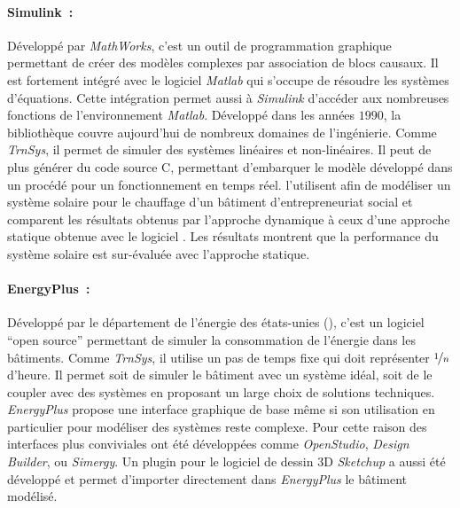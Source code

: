 \paragraph{Simulink~:} %
\label{par:simulink}
Développé par \textit{MathWorks}, c’est un outil de programmation graphique permettant de
créer des modèles complexes par association de blocs causaux. Il est fortement intégré
avec le logiciel \textit{Matlab} qui s’occupe de résoudre les systèmes d’équations. Cette
intégration permet aussi à  \textit{Simulink} d’accéder aux nombreuses fonctions de
l’environnement \textit{Matlab}.
Développé dans les années $1990$, la bibliothèque couvre
aujourd’hui de nombreux domaines de l’ingénierie. Comme \textit{TrnSys}, il permet de
simuler des systèmes linéaires et non-linéaires. Il peut de plus générer du code source C,
permettant d’embarquer le modèle développé dans un procédé pour un fonctionnement en temps
réel. \textcite{Mosallat2013686} l’utilisent afin de modéliser un système solaire pour le
chauffage d’un bâtiment d’entrepreneuriat social et comparent les résultats obtenus par
l’approche dynamique à ceux d’une approche statique obtenue avec le logiciel
. Les résultats montrent que la performance
du système solaire est sur-évaluée avec l’approche statique.

\paragraph{EnergyPlus~:} %
\label{par:energyplus}
Développé par le département de l’énergie des états-unies (), c’est un logiciel
\enquote{open source} permettant de simuler la consommation de l’énergie dans les
bâtiments. Comme \textit{TrnSys}, il utilise un pas de temps fixe qui doit représenter
$\nicefrac{1}{n}$ d’heure. Il permet soit de simuler le bâtiment avec un système
idéal, soit de le coupler avec des systèmes en proposant un large choix de solutions
techniques. \textit{EnergyPlus} propose une interface graphique de base même si son
utilisation en particulier pour modéliser des systèmes reste complexe. Pour cette raison
des interfaces plus conviviales ont été développées comme \textit{OpenStudio},
\textit{Design Builder}, ou \textit{Simergy}. Un plugin pour le
logiciel de dessin $3$D \textit{Sketchup} a aussi été développé et permet d’importer
directement dans \textit{EnergyPlus} le bâtiment modélisé.

